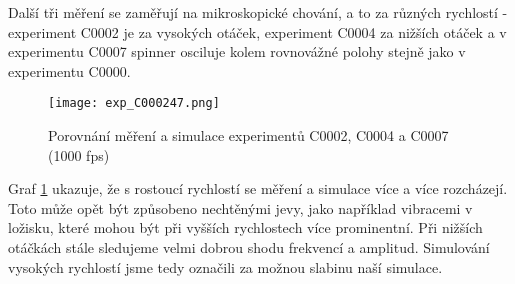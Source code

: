 Další tři měření se zaměřují na mikroskopické chování, a to za různých rychlostí - experiment C0002 je za vysokých otáček, experiment C0004 za nižších otáček a v experimentu C0007 spinner osciluje kolem rovnovážné polohy stejně jako v experimentu C0000.

\begin{figure}[!ht]
    \texttt{[image: exp\_C000247.png]}
    \centering
    \caption{Porovnání měření a simulace experimentů C0002, C0004 a C0007 (1000 fps)}
    \label{fig:exp_C000247}
\end{figure}

Graf \ref{fig:exp_C000247} ukazuje, že s rostoucí rychlostí se měření a simulace více a více rozcházejí. Toto může opět být způsobeno nechtěnými jevy, jako například vibracemi v ložisku, které mohou být při vyšších rychlostech více prominentní. Při nižších otáčkách stále sledujeme velmi dobrou shodu frekvencí a amplitud. Simulování vysokých rychlostí jsme tedy označili za možnou slabinu naší simulace.